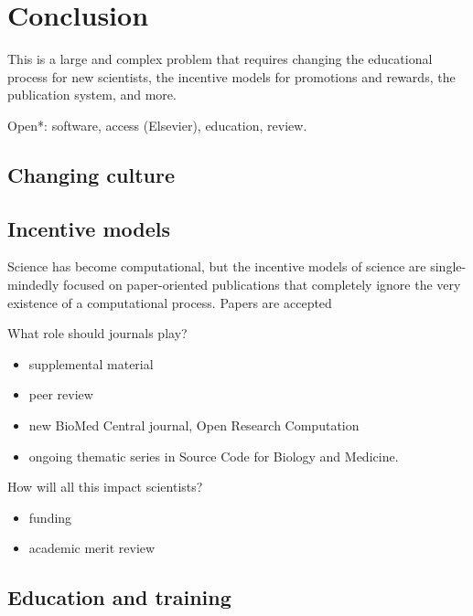\documentclass[ChapterTOCs,krantz2]{krantz} %
\begin{document}
\section{Conclusion}\label{conclusion}

This is a large and complex problem that requires changing the educational
process for new scientists, the incentive models for promotions and
rewards, the publication system, and more.

Open{*}: software, access (Elsevier), education, review.

\subsection{Changing culture}

\subsection{Incentive models}

Science has become computational, but the incentive models of science
are single-mindedly focused on paper-oriented publications that completely
ignore the very existence of a computational process. Papers are accepted 

What role should journals play?

\begin{itemize}

\item supplemental material

\item peer review

\item new BioMed Central journal, Open Research Computation

 \item ongoing thematic series in Source Code for Biology and Medicine.
\cite{neylon2012changing}

\end{itemize}

How will all this impact scientists?

\begin{itemize}

\item funding
\item academic merit review

\end{itemize}

\subsection{Education and training}
\end{document}
